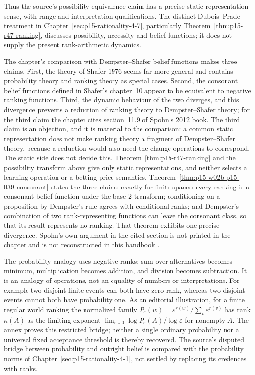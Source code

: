 Thus the source's possibility-equivalence claim has a precise static
representation sense, with range and interpretation qualifications.
The distinct Dubois--Prade treatment in
Chapter~\ref{sec:p15-rationality-4-7}, particularly
Theorem~\ref{thm:p15-r47-ranking}, discusses possibility, necessity and
belief functions; it does not supply the present rank-arithmetic dynamics.

The chapter's comparison with Dempster--Shafer belief functions makes three
claims.  First, the theory of Shafer 1976 seems far more general and
contains probability theory and ranking theory as special cases.  Second,
the consonant belief functions defined in Shafer's chapter~10 appear to be
equivalent to negative ranking functions.  Third, the dynamic behaviour of
the two diverges, and this divergence prevents a reduction of ranking theory
to Dempster--Shafer theory; for the third claim the chapter cites section~11.9
of Spohn's 2012 book.  The third claim is an objection, and it is material
to the comparison: a common static representation does not make ranking
theory a fragment of Dempster--Shafer theory, because a reduction would also
need the change operations to correspond.  The static side does not decide
this.  Theorem~\ref{thm:p15-r47-ranking} and the possibility transform above
give only static representations, and neither selects a learning operation
or a betting-price semantics.
Theorem~\ref{thm:p15-w02b-p15-039-consonant} states the three claims
exactly for finite spaces: every ranking is a consonant belief function
under the base-\(2\) transform; conditioning on a proposition by Dempster's
rule agrees with conditional ranks; and Dempster's combination of two
rank-representing functions can leave the consonant class, so that its
result represents no ranking.  That theorem exhibits one precise
divergence.  Spohn's own argument in the cited section is not printed in the
chapter and is not reconstructed in this handbook
\parencite[pp.~341--342]{KernIsbernerSkovgaardOlsenSpohn2021Ranking}.

The probability analogy uses negative ranks: sum over alternatives becomes
minimum, multiplication becomes addition, and division becomes subtraction.
It is an analogy of operations, not an equality of numbers or interpretations.
For example two disjoint finite events can both have zero rank, whereas two
disjoint events cannot both have probability one.  As an editorial illustration,
for a finite regular world ranking the normalized family
\(P_\varepsilon(w)=\varepsilon^{r(w)}/\sum_v\varepsilon^{r(v)}\)
has rank \(\kappa(A)\) as the limiting exponent
\(\lim_{\varepsilon\downarrow0}\log P_\varepsilon(A)/\log\varepsilon\)
for nonempty \(A\).  The annex proves this restricted bridge; neither a
single ordinary probability nor a universal fixed acceptance threshold is
thereby recovered.  The source's disputed bridge between probability and
outright belief is compared with the probability norms of
Chapter~\ref{sec:p15-rationality-4-1}, not settled by replacing its credences
with ranks.

